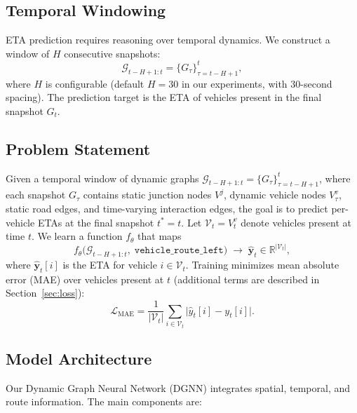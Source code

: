 \subsection{Temporal Windowing}
ETA prediction requires reasoning over temporal dynamics. We construct a window of $H$ consecutive snapshots:
\[
\mathcal{G}_{t-H+1:t} = \{G_\tau\}_{\tau=t-H+1}^t,
\]
where $H$ is configurable (default $H{=}30$ in our experiments, with 30-second spacing). The prediction target is the ETA of vehicles present in the final snapshot $G_t$.

\subsection{Problem Statement}
Given a temporal window of dynamic graphs $\mathcal{G}_{t-H+1:t}=\{G_{\tau}\}_{\tau=t-H+1}^{t}$, where each snapshot $G_{\tau}$ contains static junction nodes $V^{j}$, dynamic vehicle nodes $V^{v}_{\tau}$, static road edges, and time-varying interaction edges, the goal is to predict per-vehicle ETAs at the final snapshot $t^*{=}t$. Let $\mathcal{V}_t = V^{v}_{t}$ denote vehicles present at time $t$. We learn a function $f_{\theta}$ that maps
\[
f_{\theta}\big(\mathcal{G}_{t-H+1:t},\;\texttt{vehicle\_route\_left}\big) \;\to\; \hat{\mathbf{y}}_t \in \mathbb{R}^{|\mathcal{V}_t|},
\]
where $\hat{\mathbf{y}}_t[i]$ is the ETA for vehicle $i\in\mathcal{V}_t$. Training minimizes mean absolute error (MAE) over vehicles present at $t$ (additional terms are described in Section~\ref{sec:loss}):
\[
\mathcal{L}_{\text{MAE}} = \frac{1}{|\mathcal{V}_t|}\sum_{i\in\mathcal{V}_t} \big| \hat{y}_t[i] - y_t[i] \big|.
\]

\subsection{Model Architecture}
Our Dynamic Graph Neural Network (DGNN) integrates spatial, temporal, and route information. The main components are:

